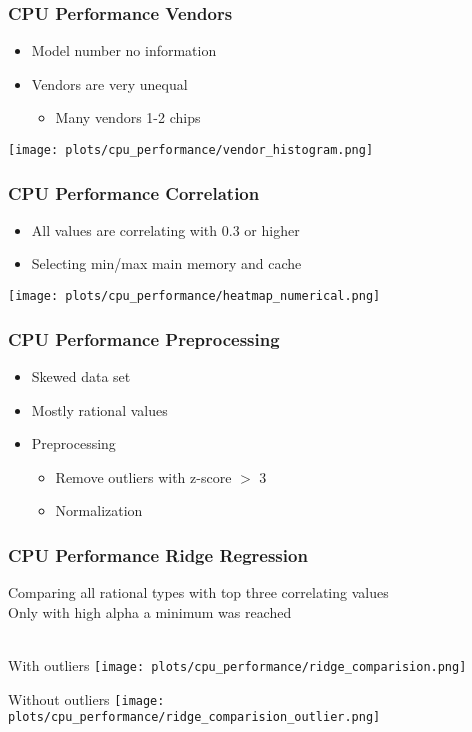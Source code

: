 \documentclass[aspectratio=169]{beamer}
\begin{document}
\begin{frame}{}
\frametitle{CPU Performance Vendors}
\begin{minipage}{0.3\textwidth}
\begin{itemize}
\item Model number no information
\item Vendors are very unequal
\begin{itemize}
	\item Many vendors 1-2 chips
\end{itemize}
\end{itemize}
\end{minipage}
\begin{minipage}{0.69\textwidth}
    \texttt{[image: plots/cpu\_performance/vendor\_histogram.png]}
\end{minipage}
\end{frame}

\begin{frame}{}
\frametitle{CPU Performance Correlation}
\begin{itemize}
	\item All values are correlating with 0.3 or higher
	\item Selecting min/max main memory and cache
\end{itemize}
    \center \texttt{[image: plots/cpu\_performance/heatmap\_numerical.png]}
\end{frame}

\begin{frame}{}
\frametitle{CPU Performance Preprocessing}
\begin{itemize}
\item Skewed data set
\item Mostly rational values
\item Preprocessing
\begin{itemize}
\item Remove outliers with z-score $>$ 3
\item Normalization
\end{itemize}
\end{itemize}
\end{frame}

\begin{frame}{}
\frametitle{CPU Performance Ridge Regression}
Comparing all rational types with top three correlating values \\
Only with high alpha a minimum was reached \\ ~\\

\begin{minipage}{0.49\textwidth}
\center With outliers
   \texttt{[image: plots/cpu\_performance/ridge\_comparision.png]}
\end{minipage}
 \begin{minipage}{0.49\textwidth}
 \center Without outliers
   \texttt{[image: plots/cpu\_performance/ridge\_comparision\_outlier.png]}
\end{minipage}
\end{frame}
\end{document}
